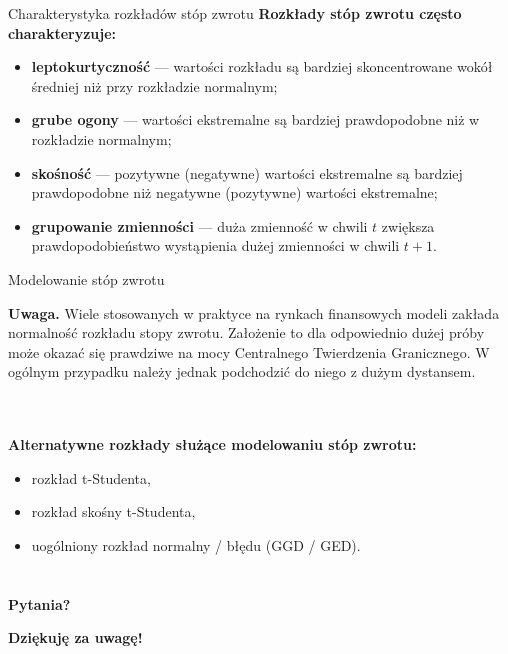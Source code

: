 \documentclass[a4paper, 11pt]{beamer}
\begin{document}
	\begin{frame}{Charakterystyka rozkładów stóp zwrotu}
		\textbf{Rozkłady stóp zwrotu często charakteryzuje:}
		\begin{itemize}
			\item \textbf{leptokurtyczność} --- wartości rozkładu są bardziej skoncentrowane
				wokół średniej niż przy rozkładzie normalnym;
			\item \textbf{grube ogony} --- wartości ekstremalne są bardziej prawdopodobne
				niż w rozkładzie normalnym;
			\item \textbf{skośność} --- pozytywne (negatywne) wartości ekstremalne są bardziej
				prawdopodobne niż negatywne (pozytywne) wartości ekstremalne;
			\item \textbf{grupowanie zmienności} --- duża zmienność w chwili $t$ zwiększa
				prawdopodobieństwo wystąpienia dużej zmienności w chwili $t+1.$
		\end{itemize}
	\end{frame}
	
	\begin{frame}{Modelowanie stóp zwrotu}
		\begin{alert}{\textbf{Uwaga. }}
			Wiele stosowanych w praktyce na rynkach finansowych modeli zakłada normalność rozkładu stopy zwrotu.
			Założenie to dla odpowiednio dużej próby może okazać się prawdziwe na mocy Centralnego Twierdzenia
			Granicznego. W ogólnym przypadku należy jednak podchodzić do niego z dużym dystansem.
		\end{alert}
		\\~\\
		\textbf{Alternatywne rozkłady służące modelowaniu stóp zwrotu:}
		\begin{itemize}
			\item rozkład t-Studenta,
			\item rozkład skośny t-Studenta,
			\item uogólniony rozkład normalny / błędu (GGD / GED).
		\end{itemize}
	\end{frame}

	\section*{}

	\begin{frame}
		\center
		\Huge \bfseries
		Pytania?
	\end{frame}

	\begin{frame}
		\center
		\Huge \bfseries
		Dziękuję za uwagę!
	\end{frame}
\end{document}
